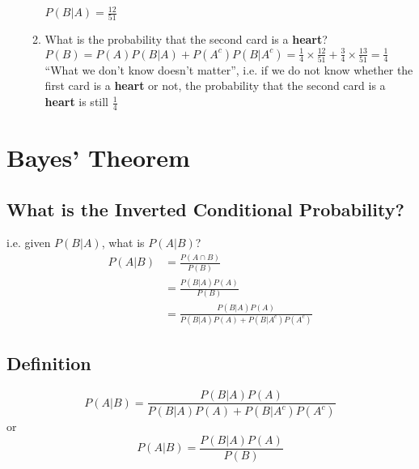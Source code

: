 \documentclass[12pt]{article}
\begin{document}
\begin{enumerate}
\begin{enumerate}
                    \\$P(B|A) = \frac{12}{51}$
                    \item What is the probability that the second card is a \textbf{heart}?
                    \\$P(B) = P(A)P(B|A) + P(A^c)P(B|A^c) = \frac{1}{4}\times\frac{12}{51} + \frac{3}{4}\times\frac{13}{51} = \frac{1}{4}$
                    \\``What we don't know doesn't matter'', i.e. if we do not know whether the first card is a \textbf{heart} or not, the probability that the second card is a \textbf{heart} is still $\frac{1}{4}$
                \end{enumerate}
            \end{enumerate}
    \section{Bayes' Theorem}
        \subsection{What is the Inverted Conditional Probability?}
            i.e. given $P(B|A)$, what is $P(A|B)$?
            \begin{align*}
                P(A|B) &= \frac{P(A \cap B)}{P(B)}\\
                &= \frac{P(B|A)P(A)}{P(B)}\\
                &= \frac{P(B|A)P(A)}{P(B|A)P(A) + P(B|A^c)P(A^c)}
            \end{align*}
        \subsection{Definition}
            \begin{equation}
                P(A|B) = \frac{P(B|A)P(A)}{P(B|A)P(A) + P(B|A^c)P(A^c)}
            \end{equation}
            or
            \begin{equation}
                P(A|B) = \frac{P(B|A)P(A)}{P(B)}
            \end{equation}
\end{document}
